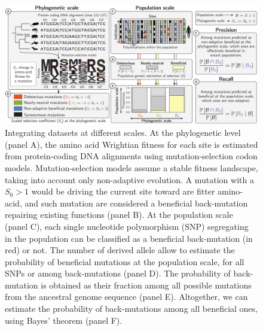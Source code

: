 \documentclass{article}
\newcommand{\Sphy}{S_{0}}
\begin{document}
    \begin{figure}[!ht]
        \centering
        \includegraphics[width=\textwidth, page=1] {artworks/figure.method.proba}
        \caption{
            Integrating datasets at different scales.
            At the phylogenetic level (panel A), the amino acid Wrightian fitness for each site is estimated from protein-coding DNA alignments using mutation-selection codon models.
            Mutation-selection models assume a stable fitness landscape, taking into account only non-adaptive evolution.
            A mutation with a $\Sphy > 1$ would be driving the current site toward are fitter amino-acid, and such mutation are considered a beneficial back-mutation repairing existing functions (panel B).
            At the population scale (panel C), each single nucleotide polymorphism (SNP) segregating in the population can be classified as a beneficial back-mutation (in red) or not.
            The number of derived allele allow to estimate the probability of beneficial mutations at the population scale, for all SNPs or among back-mutations (panel D).
            The probability of back-mutation is obtained as their fraction among all possible mutations from the ancestral genome sequence (panel E).
            Altogether, we can estimate the probability of back-mutations among all beneficial ones, using Bayes' theorem (panel F).
        }
        \label{fig:method}
    \end{figure}
\end{document}
